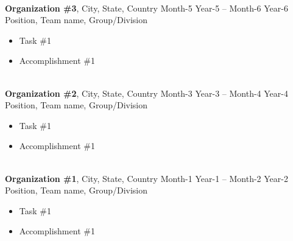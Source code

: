 \documentclass[letterpaper,10pt]{article}
\begin{document}
\hspace{-1.5cm}{\bf RELEVANT WORK EXPERIENCE}\\
{\bf Organization \#3}, City, State, Country \hfill Month-5 Year-5 -- Month-6 Year-6 \vspace{-0.05cm}\\
Position, Team name, Group/Division \\ \vspace{-0.604cm}
	\begin{itemize} \itemsep -3.7pt
	\item Task \#1
	\item Accomplishment \#1
	\end{itemize}
\vspace{-0.5cm}
\hspace{0cm}\\
{\bf Organization \#2}, City, State, Country \hfill Month-3 Year-3 -- Month-4 Year-4 \vspace{-0.05cm}\\
Position, Team name, Group/Division \\ \vspace{-0.604cm}
	\begin{itemize} \itemsep -3.7pt
	\item Task \#1
	\item Accomplishment \#1
	\end{itemize}
\vspace{-0.5cm}
\hspace{0cm}\\
{\bf Organization \#1}, City, State, Country \hfill Month-1 Year-1 -- Month-2 Year-2 \vspace{-0.05cm}\\
Position, Team name, Group/Division \\ \vspace{-0.604cm}
	\begin{itemize} \itemsep -3.7pt
	\item Task \#1
	\item Accomplishment \#1
	\end{itemize}
\hspace{0cm}
\end{document}
